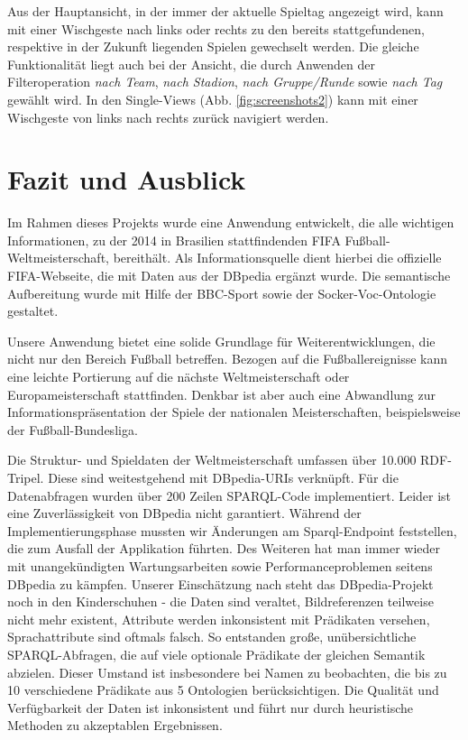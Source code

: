 \documentclass[runningheads,a4paper]{llncs}
\begin{document}
Aus der Hauptansicht, in der immer der aktuelle Spieltag angezeigt wird, kann mit einer Wischgeste nach links oder rechts zu den bereits stattgefundenen, respektive in der Zukunft liegenden Spielen gewechselt werden. Die gleiche Funktionalität liegt auch bei der Ansicht, die durch Anwenden der Filteroperation \textit{nach Team}, \textit{nach Stadion}, \textit{nach Gruppe/Runde} sowie \textit{nach Tag} gewählt wird.
In den Single-Views (Abb. \ref{fig:screenshots2}) kann mit einer Wischgeste von links nach rechts zurück navigiert werden.

\newpage

\section{Fazit und Ausblick}

Im Rahmen dieses Projekts wurde eine Anwendung entwickelt, die alle wichtigen Informationen, zu der 2014 in Brasilien stattfindenden FIFA Fußball-Weltmeisterschaft, bereithält. Als Informationsquelle dient hierbei die offizielle FIFA-Webseite, die mit Daten aus der DBpedia ergänzt wurde. Die semantische Aufbereitung wurde mit Hilfe der BBC-Sport sowie der Socker-Voc-Ontologie gestaltet.  

Unsere Anwendung bietet eine solide Grundlage für Weiterentwicklungen, die nicht nur den Bereich Fußball betreffen. Bezogen auf die Fußballereignisse kann eine leichte Portierung auf die nächste Weltmeisterschaft oder Europameisterschaft stattfinden. Denkbar ist aber auch eine Abwandlung zur Informationspräsentation der Spiele der nationalen Meisterschaften, beispielsweise der Fußball-Bundesliga.

Die Struktur- und Spieldaten der Weltmeisterschaft umfassen über 10.000 RDF-Tripel. Diese sind weitestgehend mit DBpedia-URIs verknüpft. Für die Datenabfragen wurden über 200 Zeilen SPARQL-Code implementiert. Leider ist eine Zuverlässigkeit von DBpedia nicht garantiert. Während der Implementierungsphase mussten wir Änderungen am Sparql-Endpoint feststellen, die zum Ausfall der Applikation führten. Des Weiteren hat man immer wieder mit unangekündigten Wartungsarbeiten sowie Performanceproblemen seitens DBpedia zu kämpfen. Unserer Einschätzung nach steht das DBpedia-Projekt noch in den Kinderschuhen - die Daten sind veraltet, Bildreferenzen teilweise nicht mehr existent, Attribute werden inkonsistent mit Prädikaten versehen, Sprachattribute sind oftmals falsch. So entstanden große, unübersichtliche SPARQL-Abfragen, die auf viele optionale Prädikate der gleichen Semantik abzielen. Dieser Umstand ist insbesondere bei Namen zu beobachten, die bis zu 10 verschiedene Prädikate aus 5 Ontologien berücksichtigen. Die Qualität und Verfügbarkeit der Daten ist inkonsistent und führt nur durch heuristische Methoden zu akzeptablen Ergebnissen.
\end{document}
